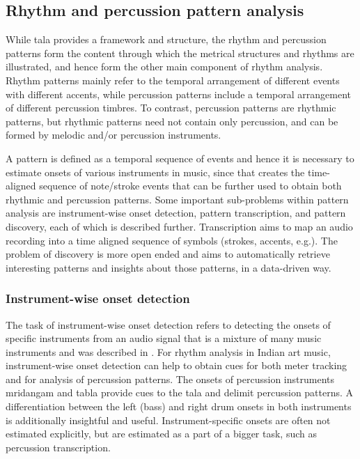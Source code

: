 \subsection{Rhythm and percussion pattern analysis}
While \gls{tala} provides a framework and structure, the rhythm and percussion patterns form the content through which the metrical structures and rhythms are illustrated, and hence form the other main component of rhythm analysis. Rhythm patterns mainly refer to the temporal arrangement of different events with different accents, while percussion patterns include a temporal arrangement of different percussion timbres. To contrast, percussion patterns are rhythmic patterns, but rhythmic patterns need not contain only percussion, and can be formed by melodic and/or percussion instruments. 

A pattern is defined as a temporal sequence of events and hence it is necessary to estimate onsets of various instruments in music, since that creates the time-aligned sequence of note/stroke events that can be further used to obtain both rhythmic and percussion patterns. Some important sub-problems within pattern analysis are instrument-wise onset detection, pattern transcription, and pattern discovery, each of which is described further. Transcription aims to map an audio recording into a time aligned sequence of symbols (strokes, accents, e.g.). The problem of discovery is more open ended and aims to automatically retrieve interesting patterns and insights about those patterns, in a data-driven way. 
%
\subsubsection{Instrument-wise onset detection}
The task of instrument-wise onset detection refers to detecting the onsets of specific instruments from an audio signal that is a mixture of many music instruments and was described in . For rhythm analysis in Indian art music, instrument-wise onset detection can help to obtain cues for both meter tracking and for analysis of percussion patterns. The onsets of percussion instruments mridangam and \gls{tabla} provide cues to the \gls{tala} and delimit percussion patterns. A differentiation between the left (bass) and right drum onsets in both instruments is additionally insightful and useful. Instrument-specific onsets are often not estimated explicitly, but are estimated as a part of a bigger task, such as percussion transcription. %

